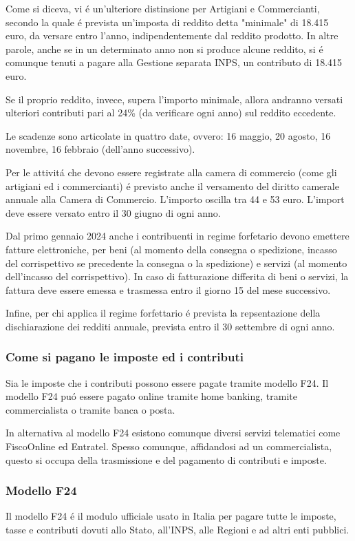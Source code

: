 \documentclass{article}
\begin{document}
Come si diceva, vi \'e un'ulteriore distinsione per Artigiani e Commercianti, secondo la quale \'e prevista un'imposta di reddito detta "minimale" di 18.415 euro, da versare entro l'anno, indipendentemente dal reddito prodotto.
In altre parole, anche se in un determinato anno non si produce alcune reddito, si \'e comunque tenuti a pagare alla Gestione separata INPS, un contributo di 18.415 euro.

Se il proprio reddito, invece, supera l'importo minimale, allora andranno versati ulteriori contributi pari al 24\% (da verificare ogni anno) sul reddito eccedente.

Le scadenze sono articolate in quattro date, ovvero: 16 maggio, 20 agosto, 16 novembre, 16 febbraio (dell'anno successivo).

Per le attivit\'a che devono essere registrate alla camera di commercio (come gli artigiani ed i commercianti) \'e previsto anche il versamento del diritto camerale annuale alla Camera di Commercio. L'importo oscilla tra 44 e 53 euro. L'import deve essere versato entro il 30 giugno di ogni anno.

Dal primo gennaio 2024 anche i contribuenti in regime forfetario devono emettere fatture elettroniche, per beni (al momento della consegna o spedizione, incasso del corrispettivo se precedente la consegna o la spedizione)
e servizi (al momento dell'incasso del corrispettivo). In caso di fatturazione differita di beni o servizi, la fattura deve essere emessa e trasmessa entro il giorno 15 del mese successivo.

Infine, per chi applica il regime forfettario \'e prevista la repsentazione della dischiarazione dei redditi annuale, prevista entro il 30 settembre di ogni anno. 

\subsubsection{Come si pagano le imposte ed i contributi}
Sia le imposte che i contributi possono essere pagate tramite modello F24. 
Il modello F24 pu\'o essere pagato online tramite home banking, tramite commercialista o tramite banca o posta.

In alternativa al modello F24 esistono comunque diversi servizi telematici come FiscoOnline ed Entratel. Spesso comunque, affidandosi ad un commercialista, questo si occupa della trasmissione e del pagamento di contributi e imposte.

\subsubsection{Modello F24}
Il modello F24 \'e il modulo ufficiale usato in Italia per pagare tutte le imposte, tasse e contributi dovuti allo Stato, all'INPS, alle Regioni e ad altri enti pubblici.
\end{document}

